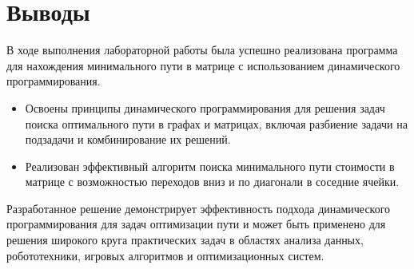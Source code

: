 \section{Выводы}

В ходе выполнения лабораторной работы была успешно реализована программа для нахождения минимального пути в матрице с использованием динамического программирования.

\begin{itemize}
    \item Освоены принципы динамического программирования для решения задач поиска оптимального пути в графах и матрицах, включая разбиение задачи на подзадачи и комбинирование их решений.
    
    \item Реализован эффективный алгоритм поиска минимального пути стоимости в матрице с возможностью переходов вниз и по диагонали в соседние ячейки.
    
\end{itemize}

Разработанное решение демонстрирует эффективность подхода динамического программирования для задач оптимизации пути и может быть применено для решения широкого круга практических задач в областях анализа данных, робототехники, игровых алгоритмов и оптимизационных систем.

\pagebreak